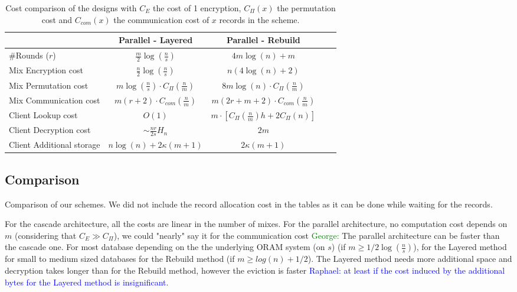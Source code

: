 \documentclass{llncs}
\newcommand{\raphael}[1]{\textcolor{blue}{Raphael: #1}}
\newcommand{\george}[1]{\textcolor{green}{George: #1}}
\begin{document}
\begin{table*}
\centering
\begin{tabular}{l *4c}
\toprule
& Parallel - Layered 						& Parallel - Rebuild\\
\midrule
\#Rounds ($r$)  & $\frac{m}{2} \log\left( \frac{n}{s}\right)$ &  $4m\log(n) +  m$ \\
Mix Encryption cost  & $\frac{n}{2} \log\left (\frac{n}{s}\right)$ & $n(4\log(n) + 2) $ \\
Mix Permutation cost & $m \log\left (\frac{n}{s}\right)\cdot C_{\Pi}\left(\frac{n}{m}\right)$ & $8m\log(n) \cdot C_{\Pi}\left ( \frac{n}{m} \right )$ \\
Mix Communication cost & $m(r+2) \cdot C_{com}\left(\frac{n}{m}\right)$ & $m(2r+m+2) \cdot C_{com}\left(\frac{n}{m}\right)$\\
Client Lookup cost & $O(1)$ & $m \cdot [C_{\Pi}\left ( \frac{n}{m}\right )h+ 2C_{\Pi}(n)]$\\
Client Decryption cost &  $\sim \frac{nr}{2s} H_n$ & $2m$\\
Client Additional storage &$n\log(n)+ 2 \kappa  (m+1)$ & $2 \kappa  (m+1)$ \\
\bottomrule
\end{tabular}
\centering
\caption{Cost comparison of the designs with $C_{E}$ the cost of 1 encryption, $C_{\Pi}(x)$ the permutation cost and $C_{com}(x)$ the communication cost of $x$ records in the scheme.}
\end{table*}

\subsection{Comparison}\label{Comparison}
Comparison of our schemes.
We did not include the record allocation cost in the tables as it can be done while waiting for the records.

For the cascade architecture, all the costs are linear in the number of mixes.
For the parallel architecture, no computation cost depends on $m$ (considering that $C_E \gg C_{\Pi}$), we could "nearly" say it for the communication cost \george{}
The parallel architecture can be faster than the cascade one. For most database depending on the the underlying ORAM system (on $s$) (if $m \geq 1/2 \log(\frac{n}{s})$), for the Layered method for small to medium sized databases for the Rebuild method (if $m \geq log(n) +1/2$).
The Layered method needs more additional space and decryption takes longer than for the Rebuild method, however the eviction is faster \raphael{at least if the cost induced by the additional bytes for the Layered method is insignificant}.
\end{document}
